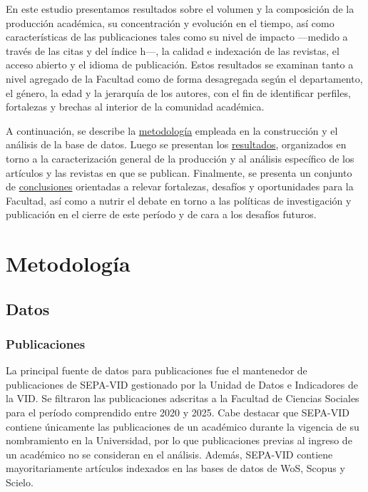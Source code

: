 \documentclass[
  spanish,
  a4paper,
  oneside]{scrbook}
\begin{document}
En este estudio presentamos resultados sobre el volumen y la composición
de la producción académica, su concentración y evolución en el tiempo,
así como características de las publicaciones tales como su nivel de
impacto ---medido a través de las citas y del índice h---, la calidad e
indexación de las revistas, el acceso abierto y el idioma de
publicación. Estos resultados se examinan tanto a nivel agregado de la
Facultad como de forma desagregada según el departamento, el género, la
edad y la jerarquía de los autores, con el fin de identificar perfiles,
fortalezas y brechas al interior de la comunidad académica.

A continuación, se describe la \href{02-metodologia.qmd}{metodología}
empleada en la construcción y el análisis de la base de datos. Luego se
presentan los \href{03-resultados.qmd}{resultados}, organizados en torno
a la caracterización general de la producción y al análisis específico
de los artículos y las revistas en que se publican. Finalmente, se
presenta un conjunto de \href{04-conclusiones.qmd}{conclusiones}
orientadas a relevar fortalezas, desafíos y oportunidades para la
Facultad, así como a nutrir el debate en torno a las políticas de
investigación y publicación en el cierre de este período y de cara a los
desafíos futuros.


\chapter{Metodología}\label{sec-methods}

\section{Datos}\label{datos-1}

\subsection{Publicaciones}\label{publicaciones}

La principal fuente de datos para publicaciones fue el mantenedor de
publicaciones de SEPA-VID gestionado por la Unidad de Datos e
Indicadores de la VID. Se filtraron las publicaciones adscritas a la
Facultad de Ciencias Sociales para el período comprendido entre 2020 y
2025. Cabe destacar que SEPA-VID contiene únicamente las publicaciones
de un académico durante la vigencia de su nombramiento en la
Universidad, por lo que publicaciones previas al ingreso de un académico
no se consideran en el análisis. Además, SEPA-VID contiene
mayoritariamente artículos indexados en las bases de datos de WoS,
Scopus y Scielo.
\end{document}
